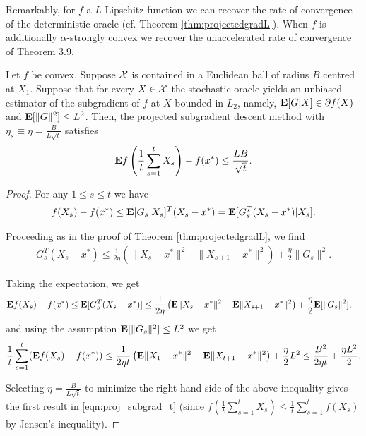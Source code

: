 Remarkably, for $f$ a $L$-Lipschitz function we can recover the rate of convergence of the deterministic oracle (cf. Theorem \ref{thm:projectedgradL}). When $f$ is additionally $\alpha$-strongly convex we recover the unaccelerated rate of convergence of \cite{bubeck} Theorem 3.9.

\begin{theorem}
\label{thm:projectedgradLstoch}
Let $f$ be convex. Suppose $\mathcal{X}$ is contained in a Euclidean ball of radius $B$ centred at $X_1$. Suppose that for every $X \in \mathcal{X}$ the stochastic oracle yields an unbiased estimator of the subgradient of $f$ at $X$ bounded in $L_2$, namely, $\mathbf{E}[G |X]\in \partial f(X)$ and $\mathbf{E}[\|G\|^2] \leq L^2$. Then, the projected subgradient descent method with $\eta_s\equiv\eta = \frac{B}{L\sqrt{t}}$ satisfies 
\begin{equation} \label{eqn:proj_subgrad_t stoch}
\mathbf{E} f\left(\frac{1}{t} \sum_{s=1}^t X_s\right) - f(x^*) \leq \frac{LB}{\sqrt{t}}.
\end{equation}
\begin{proof}
For any $1 \leq s \leq t$ we have
\begin{align*}
	f(X_s) - f(x^*)
	\le \mathbf{E} [G_s|X_s]^T(X_s - x^*)
	= \mathbf{E} [G_s^T(X_s - x^*)|X_s].
\end{align*}

Proceeding as in the proof of Theorem \ref{thm:projectedgradL}, we find
\begin{align*}
	G_s^T(X_s - x^*)
	\le \frac{1}{2\eta} \left( \|X_s - x^*\|^2 - \|X_{s+1} - x^*\|^2 \right) + \frac{\eta}{2} \|G_s\|^2.
\end{align*}

Taking the expectation, we get
\begin{align*}
	\mathbf{E} f(X_s) - f(x^*) &\leq 
	\mathbf{E} [G_s^T(X_s - x^*)]
	\le \frac{1}{2\eta} \left( \mathbf{E}\|X_s - x^*\|^2 - \mathbf{E}\|X_{s+1} - x^*\|^2 \right) + \frac{\eta}{2} \mathbf{E}[\|G_s\|^2],
\end{align*}
and using the assumption $\mathbf{E}[\|G_s\|^2]\le L^2$ we get
\[
\frac{1}{t} \sum_{s=1}^t (\mathbf{E} f(X_s) - f(x^*)) \leq \frac{1}{2 \eta t} \left( \mathbf{E}\| X_1 - x^* \|^2 - \mathbf{E}\| X_{t+1} - x^* \|^2 \right) + \frac{\eta}{2} L^2 \leq \frac{B^2}{2 \eta t} + \frac{\eta L^2 }{2}.
\]

Selecting $\eta = \frac{B}{L\sqrt{t}}$ to minimize the right-hand side of the above inequality gives the first result in \eqref{eqn:proj_subgrad_t} (since $f\left(\frac{1}{t}\sum_{s=1}^t X_s \right) \leq \frac{1}{t} \sum_{s=1}^t f(X_s)$ by Jensen's inequality).
\end{proof}
\end{theorem}



